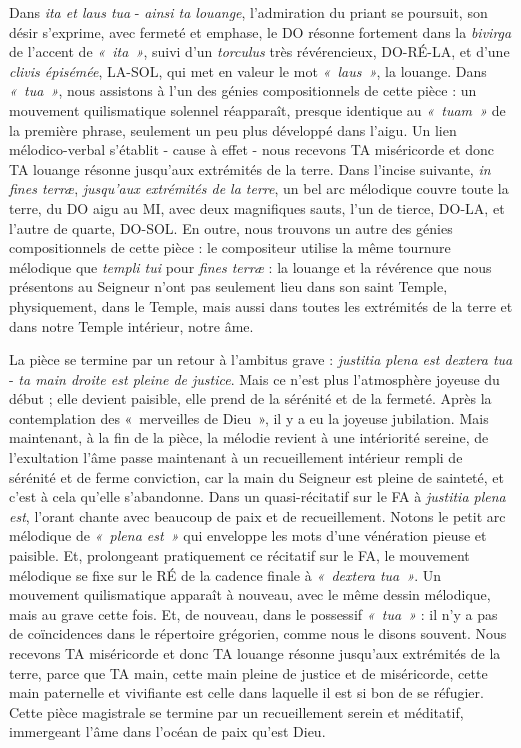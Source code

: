 \documentclass[Session2026.tex]{subfiles}
\begin{document}
Dans \emph{ita et laus tua} - \emph{ainsi ta louange}, l'admiration du
priant se poursuit, son désir s'exprime, avec fermeté et emphase, le DO
résonne fortement dans la \emph{bivirga} de l'accent de \emph{«~ita~»},
suivi d'un \emph{torculus} très révérencieux, DO-RÉ-LA, et d'une
\emph{clivis épisémée}, LA-SOL, qui met en valeur le mot
\emph{«~laus~»}, la louange. Dans \emph{«~tua~»}, nous assistons à l'un
des génies compositionnels de cette pièce : un mouvement quilismatique
solennel réapparaît, presque identique au \emph{«~tuam~»} de la première
phrase, seulement un peu plus développé dans l'aigu. Un lien
mélodico-verbal s'établit - cause à effet - nous recevons TA miséricorde
et donc TA louange résonne jusqu'aux extrémités de la terre. Dans
l'incise suivante, \emph{in fines terræ}, \emph{jusqu'aux extrémités de
la terre}, un bel arc mélodique couvre toute la terre, du DO aigu au MI,
avec deux magnifiques sauts, l'un de tierce, DO-LA, et l'autre de
quarte, DO-SOL. En outre, nous trouvons un autre des génies
compositionnels de cette pièce : le compositeur utilise la même tournure
mélodique que \emph{templi tui} pour \emph{fines terræ} : la louange et
la révérence que nous présentons au Seigneur n'ont pas seulement lieu
dans son saint Temple, physiquement, dans le Temple, mais aussi dans
toutes les extrémités de la terre et dans notre Temple intérieur, notre
âme.

La pièce se termine par un retour à l'ambitus grave : \emph{justitia
plena est dextera tua} - \emph{ta main droite est pleine de justice}.
Mais ce n'est plus l'atmosphère joyeuse du début ; elle devient
paisible, elle prend de la sérénité et de la fermeté. Après la
contemplation des «~merveilles de Dieu~», il y a eu la joyeuse
jubilation. Mais maintenant, à la fin de la pièce, la mélodie revient à
une intériorité sereine, de l'exultation l'âme passe maintenant à un
recueillement intérieur rempli de sérénité et de ferme conviction, car
la main du Seigneur est pleine de sainteté, et c'est à cela qu'elle
s'abandonne. Dans un quasi-récitatif sur le FA à \emph{justitia plena
est}, l'orant chante avec beaucoup de paix et de recueillement. Notons
le petit arc mélodique de \emph{«~plena est~»} qui enveloppe les mots
d'une vénération pieuse et paisible. Et, prolongeant pratiquement ce
récitatif sur le FA, le mouvement mélodique se fixe sur le RÉ de la
cadence finale à \emph{«~dextera tua~»}. Un mouvement quilismatique
apparaît à nouveau, avec le même dessin mélodique, mais au grave cette
fois. Et, de nouveau, dans le possessif \emph{«~tua~»} : il n'y a pas de
coïncidences dans le répertoire grégorien, comme nous le disons souvent.
Nous recevons TA miséricorde et donc TA louange résonne jusqu'aux
extrémités de la terre, parce que TA main, cette main pleine de justice
et de miséricorde, cette main paternelle et vivifiante est celle dans
laquelle il est si bon de se réfugier. Cette pièce magistrale se termine
par un recueillement serein et méditatif, immergeant l'âme dans l'océan
de paix qu'est Dieu.
\end{document}
